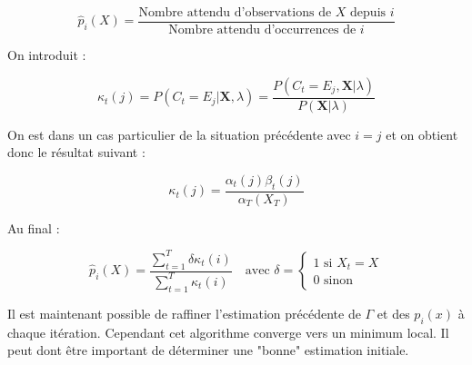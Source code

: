 \documentclass[12pt, french]{report}
\begin{document}
\begin{equation}
\hat{p}_i(X) = \frac{\text{Nombre attendu d'observations de }X\text{ depuis }i}
{\text{Nombre attendu d'occurrences  de }i}
\end{equation}

On introduit :

\begin{equation}
\kappa_t(j) = P(C_t=E_j|\bm{X},\lambda) = \frac{P(C_t=E_j,\bm{X}|\lambda)}{P(\bm{X}|\lambda)}
\end{equation} 

On est dans un cas particulier de la situation précédente avec $i=j$ et on obtient donc le résultat suivant :

\begin{equation}
\kappa_t(j) = \frac{\alpha_t(j)\beta_t(j)}{\alpha_T(X_T)}
\end{equation}

Au final :

\begin{equation}
\hat{p}_i(X) = \frac
{\sum\limits_{t=1}^T  \delta \kappa_t(i)}
{\sum\limits_{t=1}^T  \kappa_t(i)}
\quad \text{avec } \delta=
\begin{cases}
1\text{ si }X_t=X \\
0\text{ sinon}
\end{cases}
\end{equation}

Il est maintenant possible de raffiner l'estimation précédente de $\Gamma$ et des $p_i(x)$ à chaque itération. Cependant cet algorithme converge vers un minimum local. Il peut dont être important de déterminer une "bonne" estimation initiale.




\end{document}

